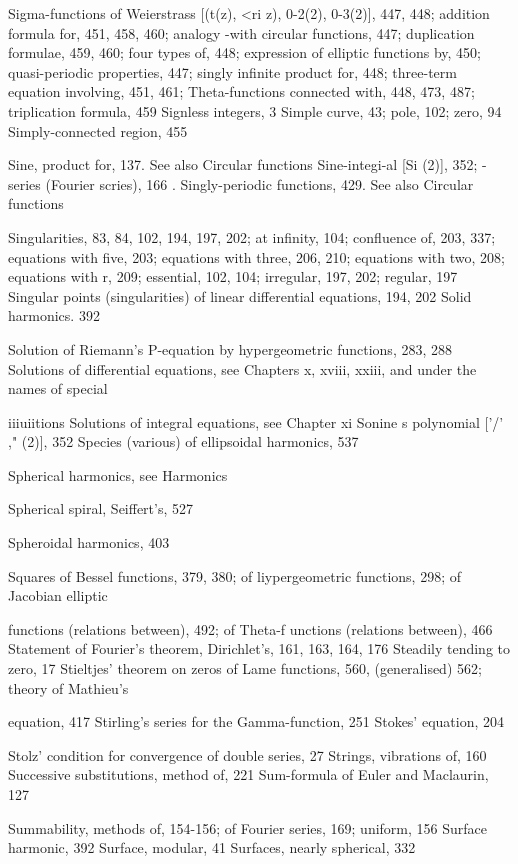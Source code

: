 Sigma-functions of Weierstrass [(t(z), <ri z), 0-2(2), 0-3(2)], 447, 448; addition formula for, 451,
458, 460; analogy -with circular functions, 447; duplication formulae, 459, 460; four
types of, 448; expression of elliptic functions by, 450; quasi-periodic properties, 447;
singly infinite product for, 448; three-term equation involving, 451, 461; Theta-functions
connected with, 448, 473, 487; triplication formula, 459
Signless integers, 3
Simple curve, 43; pole, 102; zero, 94
Simply-connected region, 455

Sine, product for, 137. See also Circular functions
Sine-integi-al [Si (2)], 352; -series (Fourier scries), 166 .
Singly-periodic functions, 429. See also Circular functions

Singularities, 83, 84, 102, 194, 197, 202; at infinity, 104; confluence of, 203, 337; equations
with five, 203; equations with three, 206, 210; equations with two, 208; equations with r,
209; essential, 102, 104; irregular, 197, 202; regular, 197
Singular points (singularities) of linear differential equations, 194, 202
Solid harmonics. 392

Solution of Riemann's P-equation by hypergeometric functions, 283, 288
Solutions of differential equations, see Chapters x, xviii, xxiii, and under the names of special

iiiuiitions
Solutions of integral equations, see Chapter xi
Sonine s polynomial ['/' ," (2)], 352
Species (various) of ellipsoidal harmonics, 537

%
%

Spherical harmonics, see Harmonics

Spherical spiral, Seiffert's, 527

Spheroidal harmonics, 403

Squares of Bessel functions, 379, 380; of liypergeometric functions, 298; of Jacobian elliptic

functions (relations between), 492; of Theta-f unctions (relations between), 466
Statement of Fourier's theorem, Dirichlet's, 161, 163, 164, 176
Steadily tending to zero, 17
Stieltjes' theorem on zeros of Lame functions, 560, (generalised) 562; theory of Mathieu's

equation, 417
Stirling's series for the Gamma-function, 251
Stokes' equation, 204

Stolz' condition for convergence of double series, 27
Strings, vibrations of, 160
Successive substitutions, method of, 221
Sum-formula of Euler and Maclaurin, 127

Summability, methods of, 154-156; of Fourier series, 169; uniform, 156
Surface harmonic, 392
Surface, modular, 41
Surfaces, nearly spherical, 332

